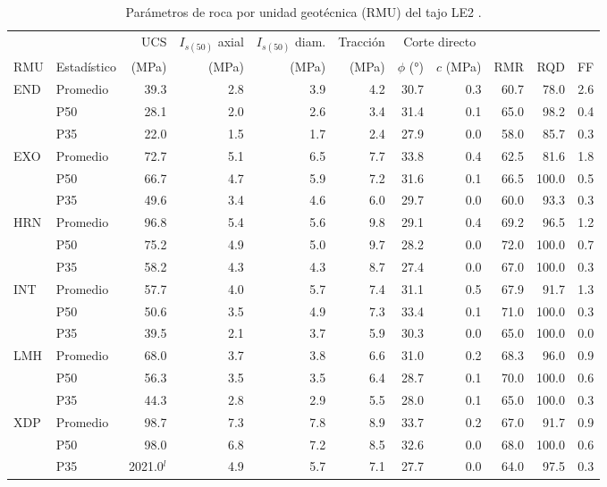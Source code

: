 \documentclass[11pt,letterpaper]{article}
\begin{document}
\begin{table}[H]\centering\scriptsize\setlength{\tabcolsep}{3pt}\caption{Parámetros de roca por unidad geotécnica (RMU) del tajo LE2 \citep[lámina~4 y planilla]{antamina2025le2}.}\label{tab:b_rmu}
\begin{tabular}{llrrrrrrrrr}\toprule
 & & UCS & $I_{s(50)}$ axial & $I_{s(50)}$ diam. & Tracción & \multicolumn{2}{c}{Corte directo} & & & \\\cmidrule(lr){7-8}
RMU & Estadístico & (MPa) & (MPa) & (MPa) & (MPa) & $\phi$ (°) & $c$ (MPa) & RMR & RQD & FF\\\midrule
END & Promedio & 39.3 & 2.8 & 3.9 & 4.2 & 30.7 & 0.3 & 60.7 & 78.0 & 2.6 \\
 & P50 & 28.1 & 2.0 & 2.6 & 3.4 & 31.4 & 0.1 & 65.0 & 98.2 & 0.4 \\
 & P35 & 22.0 & 1.5 & 1.7 & 2.4 & 27.9 & 0.0 & 58.0 & 85.7 & 0.3 \\
EXO & Promedio & 72.7 & 5.1 & 6.5 & 7.7 & 33.8 & 0.4 & 62.5 & 81.6 & 1.8 \\
 & P50 & 66.7 & 4.7 & 5.9 & 7.2 & 31.6 & 0.1 & 66.5 & 100.0 & 0.5 \\
 & P35 & 49.6 & 3.4 & 4.6 & 6.0 & 29.7 & 0.0 & 60.0 & 93.3 & 0.3 \\
HRN & Promedio & 96.8 & 5.4 & 5.6 & 9.8 & 29.1 & 0.4 & 69.2 & 96.5 & 1.2 \\
 & P50 & 75.2 & 4.9 & 5.0 & 9.7 & 28.2 & 0.0 & 72.0 & 100.0 & 0.7 \\
 & P35 & 58.2 & 4.3 & 4.3 & 8.7 & 27.4 & 0.0 & 67.0 & 100.0 & 0.3 \\
INT & Promedio & 57.7 & 4.0 & 5.7 & 7.4 & 31.1 & 0.5 & 67.9 & 91.7 & 1.3 \\
 & P50 & 50.6 & 3.5 & 4.9 & 7.3 & 33.4 & 0.1 & 71.0 & 100.0 & 0.3 \\
 & P35 & 39.5 & 2.1 & 3.7 & 5.9 & 30.3 & 0.0 & 65.0 & 100.0 & 0.0 \\
LMH & Promedio & 68.0 & 3.7 & 3.8 & 6.6 & 31.0 & 0.2 & 68.3 & 96.0 & 0.9 \\
 & P50 & 56.3 & 3.5 & 3.5 & 6.4 & 28.7 & 0.1 & 70.0 & 100.0 & 0.6 \\
 & P35 & 44.3 & 2.8 & 2.9 & 5.5 & 28.0 & 0.1 & 65.0 & 100.0 & 0.3 \\
XDP & Promedio & 98.7 & 7.3 & 7.8 & 8.9 & 33.7 & 0.2 & 67.0 & 91.7 & 0.9 \\
 & P50 & 98.0 & 6.8 & 7.2 & 8.5 & 32.6 & 0.0 & 68.0 & 100.0 & 0.6 \\
 & P35 & 2021.0$^{l}$ & 4.9 & 5.7 & 7.1 & 27.7 & 0.0 & 64.0 & 97.5 & 0.3 \\

\end{tabular}
\end{table}
\end{document}
